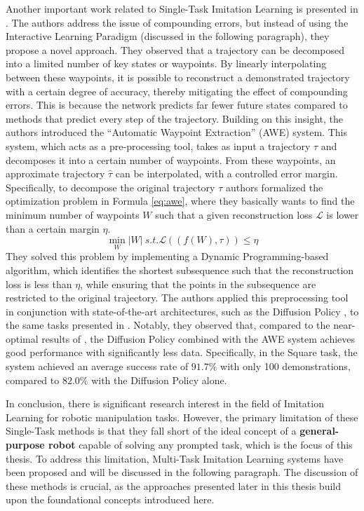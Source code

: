 Another important work related to Single-Task Imitation Learning is presented in \cite{shi2023waypoint}. The authors address the issue of compounding errors, but instead of using the Interactive Learning Paradigm (discussed in the following paragraph), they propose a novel approach. They observed that a trajectory can be decomposed into a limited number of key states or waypoints. By linearly interpolating between these waypoints, it is possible to reconstruct a demonstrated trajectory with a certain degree of accuracy, thereby mitigating the effect of compounding errors. This is because the network predicts far fewer future states compared to methods that predict every step of the trajectory. Building on this insight, the authors introduced the ``Automatic Waypoint Extraction'' (AWE) system. This system, which acts as a pre-processing tool, takes as input a trajectory $\tau$ and decomposes it into a certain number of waypoints. From these waypoints, an approximate trajectory $\hat{\tau}$ can be interpolated, with a controlled error margin.
Specifically, to decompose the original trajectory $\tau$ authors formalized the optimization problem in Formula \ref{eq:awe}, where they basically wants to find the minimum number of waypoints $W$ such that a given reconstruction loss $\mathcal{L}$ is lower than a certain margin $\eta$.
\begin{equation}
    \label{eq:awe}
    \min_{W} |W|  \ s.t. \mathcal{L}((f(W), \tau)) \le \eta
\end{equation}
They solved this problem by implementing a Dynamic Programming-based algorithm, which identifies the shortest subsequence such that the reconstruction loss is less than $\eta$, while ensuring that the points in the subsequence are restricted to the original trajectory. The authors applied this preprocessing tool in conjunction with state-of-the-art architectures, such as the Diffusion Policy \cite{cheng2023diffusion}, to the same tasks presented in \cite{mandlekar2022matters}. Notably, they observed that, compared to the near-optimal results of \cite{cheng2023diffusion}, the Diffusion Policy combined with the AWE system achieves good performance with significantly less data. Specifically, in the Square task, the system achieved an average success rate of $91.7\%$ with only 100 demonstrations, compared to $82.0\%$ with the Diffusion Policy alone.

In conclusion, there is significant research interest in the field of Imitation Learning for robotic manipulation tasks. However, the primary limitation of these Single-Task methods is that they fall short of the ideal concept of a \textbf{general-purpose robot} capable of solving any prompted task, which is the focus of this thesis. To address this limitation, Multi-Task Imitation Learning systems have been proposed and will be discussed in the following paragraph. The discussion of these methods is crucial, as the approaches presented later in this thesis build upon the foundational concepts introduced here.

